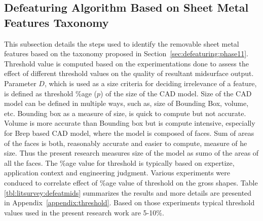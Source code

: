 \subsection{Defeaturing Algorithm Based on Sheet Metal Features \mbox{Taxonomy}} \label{sec:defeaturing:taxonomy}

This subsection details the steps used to identify the removable sheet metal features based on the taxonomy proposed in Section~\ref{sec:defeaturing:phase11}. 
Threshold value is computed based on the experimentations done\cite{YogeshCADandA2016} to assess the effect of different threshold values on the quality of resultant midsurface output. Parameter $D$, which is used as a size criteria for deciding irrelevance of a feature, is defined as threshold \%age ($p$) of the size of the CAD model. Size of the CAD model can be defined in multiple ways, such as, size of Bounding Box, volume, etc. Bounding box as a measure of size, is quick to compute but not accurate. Volume is more accurate than Bounding box but is compute intensive, especially for Brep based CAD model, where the model is composed of faces. Sum of areas of the faces is both, reasonably accurate and easier to compute, measure of he size. Thus the present research measures size of the model as sumo of the areas of all the faces. The \%age value for threshold is typically based on expertize, application context and engineering judgment. Various experiments were conduced to correlate effect of \%age value of threshold on the gross shapes. Table \ref{tbl:litsurvey:defeatmids} summarizes the results and more details are presented in Appendix~\ref{appendix:threshold}. Based on those experiments typical threshold values used in the present research work are 5-10\%.

